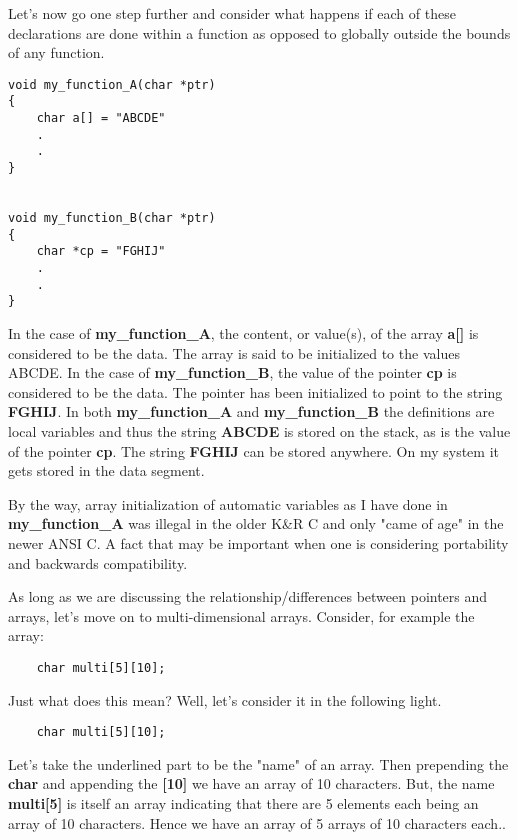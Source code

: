 Let's now go one step further and consider what happens if each of these
declarations are done within a function as opposed to globally outside
the bounds of any function.

\begin{verbatim}
void my_function_A(char *ptr)
{
    char a[] = "ABCDE"
    .
    .
} 


void my_function_B(char *ptr)
{
    char *cp = "FGHIJ"
    .
    .
}
\end{verbatim}

In the case of \textbf{my\_function\_A}, the content, or value(s), of
the array \textbf{a{[}{]}} is considered to be the data. The array is
said to be initialized to the values ABCDE. In the case of
\textbf{my\_function\_B}, the value of the pointer \textbf{cp} is
considered to be the data. The pointer has been initialized to point to
the string \textbf{FGHIJ}. In both \textbf{my\_function\_A} and
\textbf{my\_function\_B} the definitions are local variables and thus
the string \textbf{ABCDE} is stored on the stack, as is the value of the
pointer \textbf{cp}. The string \textbf{FGHIJ} can be stored anywhere.
On my system it gets stored in the data segment.

By the way, array initialization of automatic variables as I have done
in \textbf{my\_function\_A} was illegal in the older K\&R C and only
"came of age" in the newer ANSI C. A fact that may be important when one
is considering portability and backwards compatibility.

As long as we are discussing the relationship/differences between
pointers and arrays, let's move on to multi-dimensional arrays.
Consider, for example the array:

\begin{verbatim}
    char multi[5][10];
\end{verbatim}

Just what does this mean? Well, let's consider it in the following
light.

\begin{verbatim}
    char multi[5][10];
\end{verbatim}

Let's take the underlined part to be the "name" of an array. Then
prepending the \textbf{char} and appending the \textbf{{[}10{]}} we have
an array of 10 characters. But, the name \textbf{multi{[}5{]}} is itself
an array indicating that there are 5 elements each being an array of 10
characters. Hence we have an array of 5 arrays of 10 characters each..

